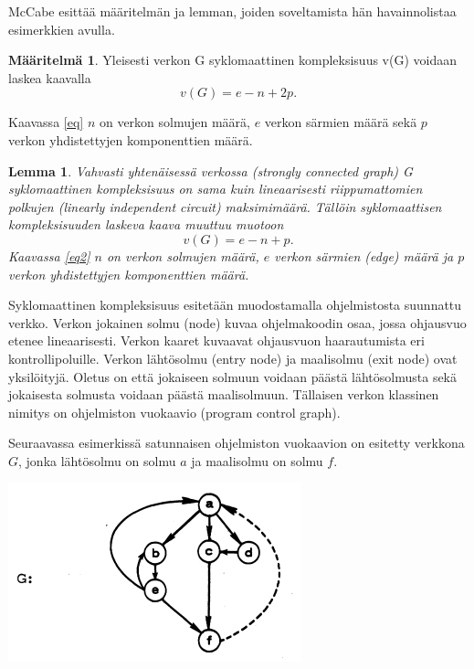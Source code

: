 \documentclass[finnish]{tktltiki2}
\newtheorem{lem}[lau]{Lemma}
\theoremstyle{definition}
\newtheorem{maar}[lau]{Määritelmä}
\theoremstyle{remark}
\begin{document}

McCabe esittää määritelmän ja lemman, joiden soveltamista hän havainnolistaa esimerkkien avulla.

\begin{maar}\label{maar1}
  Yleisesti verkon G syklomaattinen kompleksisuus v(G) voidaan laskea kaavalla
  \begin{equation}\label{eq}
    v(G) = e - n + 2p.
  \end{equation}

  Kaavassa \eqref{eq} $n$ on verkon solmujen määrä, $e$ verkon särmien määrä sekä $p$ verkon yhdistettyjen komponenttien määrä.
\end{maar}

\newpage

\begin{lem}\label{lem}
  Vahvasti yhtenäisessä verkossa (strongly connected graph) G syklomaattinen kompleksisuus on sama kuin lineaarisesti riippumattomien polkujen (linearly independent circuit) maksimimäärä. Tällöin syklomaattisen kompleksisuuden laskeva kaava muuttuu muotoon
  \begin{equation}\label{eq2}
    v(G) = e - n + p.
  \end{equation}
  Kaavassa \eqref{eq2} $n$ on verkon solmujen määrä, $e$ verkon särmien (edge) määrä ja $p$ verkon yhdistettyjen komponenttien määrä.
\end{lem}

Syklomaattinen kompleksisuus esitetään muodostamalla ohjelmistosta suunnattu verkko. Verkon jokainen solmu (node) kuvaa ohjelmakoodin osaa, jossa ohjausvuo etenee lineaarisesti. Verkon kaaret kuvaavat ohjausvuon haarautumista eri kontrollipoluille. Verkon lähtösolmu (entry node) ja maalisolmu (exit node) ovat yksilöityjä. Oletus on että jokaiseen solmuun voidaan päästä lähtösolmusta sekä jokaisesta solmusta voidaan päästä maalisolmuun. Tällaisen verkon klassinen nimitys on ohjelmiston vuokaavio (program control graph).

Seuraavassa esimerkissä satunnaisen ohjelmiston vuokaavion on esitetty verkkona $G$, jonka lähtösolmu on solmu $a$ ja maalisolmu on solmu $f$.

\centerline{\includegraphics[scale=0.7]{verkko.png}}
\end{document}
